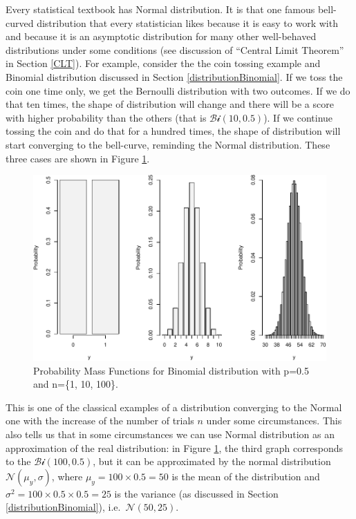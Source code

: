 \documentclass[
]{book}
\theoremstyle{definition}
\theoremstyle{definition}
\theoremstyle{definition}
\theoremstyle{definition}
\theoremstyle{remark}
\begin{document}
Every statistical textbook has Normal distribution. It is that one famous bell-curved distribution that every statistician likes because it is easy to work with and because it is an asymptotic distribution for many other well-behaved distributions under some conditions (see discussion of ``Central Limit Theorem'' in Section \ref{CLT}). For example, consider the the coin tossing example and Binomial distribution discussed in Section \ref{distributionBinomial}. If we toss the coin one time only, we get the Bernoulli distribution with two outcomes. If we do that ten times, the shape of distribution will change and there will be a score with higher probability than the others (that is \(\mathcal{Bi}(10, 0.5)\)). If we continue tossing the coin and do that for a hundred times, the shape of distribution will start converging to the bell-curve, reminding the Normal distribution. These three cases are shown in Figure \ref{fig:binomialPMFSeveral}.

\begin{figure}
\centering
\includegraphics{Svetunkov---Statistics-for-Business-Analytics_files/figure-latex/binomialPMFSeveral-1.pdf}
\caption{\label{fig:binomialPMFSeveral}Probability Mass Functions for Binomial distribution with p=0.5 and n=\{1, 10, 100\}.}
\end{figure}

This is one of the classical examples of a distribution converging to the Normal one with the increase of the number of trials \(n\) under some circumstances. This also tells us that in some circumstances we can use Normal distribution as an approximation of the real distribution: in Figure \ref{fig:binomialPMFSeveral}, the third graph corresponds to the \(\mathcal{Bi}(100, 0.5)\), but it can be approximated by the normal distribution \(\mathcal{N}(\mu_y, \sigma)\), where \(\mu_y=100 \times 0.5 = 50\) is the mean of the distribution and \(\sigma^2 = 100 \times 0.5 \times 0.5 = 25\) is the variance (as discussed in Section \ref{distributionBinomial}), i.e.~\(\mathcal{N}(50, 25)\).
\end{document}
